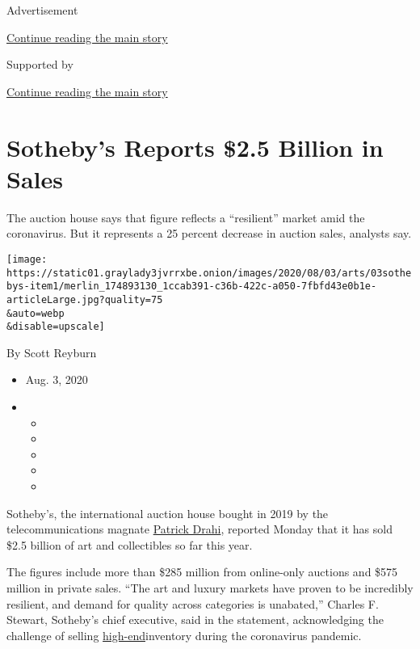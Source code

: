 Advertisement

\protect\hyperlink{after-top}{Continue reading the main story}

Supported by

\protect\hyperlink{after-sponsor}{Continue reading the main story}

\hypertarget{sothebys-reports-25-billion-in-sales}{%
\section{Sotheby's Reports \$2.5 Billion in
Sales}\label{sothebys-reports-25-billion-in-sales}}

The auction house says that figure reflects a ``resilient'' market amid
the coronavirus. But it represents a 25 percent decrease in auction
sales, analysts say.

\texttt{[image: https://static01.graylady3jvrrxbe.onion/images/2020/08/03/arts/03sothebys-item1/merlin\_174893130\_1ccab391-c36b-422c-a050-7fbfd43e0b1e-articleLarge.jpg?quality=75\\\&auto=webp\\\&disable=upscale]}

By Scott Reyburn

\begin{itemize}
\item
  Aug. 3, 2020
\item
  \begin{itemize}
  \item
  \item
  \item
  \item
  \item
  \end{itemize}
\end{itemize}

Sotheby's, the international auction house bought in 2019 by the
telecommunications magnate
\href{https://www.nytimes3xbfgragh.onion/2019/06/17/business/sothebys-patrick-drahi-bidfair.html}{Patrick
Drahi}, reported Monday that it has sold \$2.5 billion of art and
collectibles so far this year.

The figures include more than \$285 million from online-only auctions
and \$575 million in private sales. ``The art and luxury markets have
proven to be incredibly resilient, and demand for quality across
categories is unabated,'' Charles F. Stewart, Sotheby's chief executive,
said in the statement, acknowledging the challenge of selling
\href{https://www.nytimes3xbfgragh.onion/2020/07/10/your-money/auctions-wealth-coronavirus.html}{high-end}inventory
during the coronavirus pandemic.

